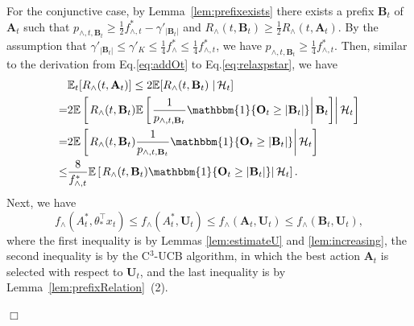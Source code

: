\documentclass{article}
\newcommand{\EE}{\mathbb{E}}
\newcommand{\bOne}{\mathbbm{1}}
\newcommand{\bA}{\mathbf{A}}
\newcommand{\bB}{\mathbf{B}}
\newcommand{\bO}{\mathbf{O}}
\newcommand{\bU}{\mathbf{U}}
\newcommand{\cH}{\mathcal{H}}
\newcommand{\abs}[1]{\left| #1 \right|}
\newenvironment{proof}{\noindent {\textbf{Proof. }}}{$\Box$ \medskip}
\begin{document}
\begin{proof}
  For the conjunctive case, by Lemma~\ref{lem:prefixexists} there exists a prefix $\bB_t$ of $\bA_t$ such that $p_{\wedge, t, \bB_t} \geq \frac{1}{2}f_{\wedge, t}^* - \gamma'_{|\bB_t|}$ and $R_{\wedge}(t, \bB_t) \geq \frac{1}{2} R_{\wedge}(t, \bA_t)$. 
  By the assumption that $\gamma'_{|\bB_t|}\le \gamma'_K \le \frac{1}{4} f^*_{\wedge} \le \frac{1}{4} f^*_{\wedge,t}  $, we have $p_{\wedge, t, \bB_t} \geq \frac{1}{4}f_{\wedge, t}^*$. 
  Then, similar to the derivation from Eq.\eqref{eq:addOt} to Eq.\eqref{eq:relaxpstar}, we have
  \begin{align}
    &\EE_t[R_{\wedge}(t, \bA_t)] \leq 2 \EE[R_{\wedge}(t, \bB_t) \left. \right| \cH_t] \nonumber \\
    =& 2 \EE \left[ \left. R_{\wedge}(t, \bB_t) \EE \left[ \left. \frac{1}{p_{\wedge, t, \bB_t}} \bOne\{\bO_t\geq\abs{\bB_t}\} \right| \bB_t \right]  \right| \cH_t \right] \nonumber \\
    =& 2\EE \left[ \left. R_{\wedge}(t, \bB_t) \frac{1}{p_{\wedge, t, \bB_t}} \bOne\{\bO_t\geq\abs{\bB_t}\}  \right| \cH_t \right] \nonumber \\
    \leq &\frac{8}{f_{\wedge, t}^{\ast}} \EE \left[ \left. R_{\wedge}(t, \bB_t) \bOne\{\bO_t\geq\abs{\bB_t}\}  \right| \cH_t \right]. \label{eq:btOneotbt}
  \end{align}
  Next, we have
  \begin{equation} \label{eq:andstarbt}
    f_{\wedge}(A_t^*, \theta_*^{\top}x_t) \leq f_{\wedge}(A_t^*,\bU_t) \leq f_{\wedge}(\bA_t,\bU_t) \leq f_{\wedge}(\bB_t,\bU_t),
  \end{equation}
  where the first inequality is by Lemmas \ref{lem:estimateU} and \ref{lem:increasing}, the second inequality is by the C$^3$-UCB algorithm, in which the best action $\bA_t$ is selected with respect to $\bU_t$, and the last inequality is by Lemma~\ref{lem:prefixRelation}~(2).
  

\end{proof}
\end{document}
